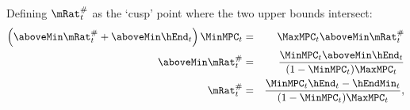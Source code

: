   Defining $\mtCusp$ as the `cusp' point where the two upper bounds
  intersect:
  \begin{eqnarray*}
    \left(\aboveMin \mtCusp+\aboveMin \hEnd_{t}\right)\MinMPC_{t} &=& \MaxMPC_{t} \aboveMin \mtCusp \\
    \aboveMin \mtCusp &=& \frac{\MinMPC_{t}\aboveMin \hEnd_{t}}{(1-\MinMPC_{t})\MaxMPC_{t}} \\
    \mtCusp &=& \frac{\MinMPC_{t}\hEnd_{t}-\hEndMin_{t}}{(1-\MinMPC_{t})\MaxMPC_{t}},
  \end{eqnarray*}
